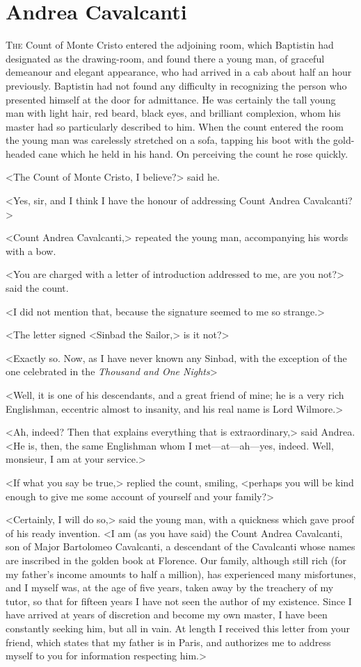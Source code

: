 \chapter{Andrea Cavalcanti} 

 \lettrine{T}{he} Count of Monte Cristo entered the adjoining room, which Baptistin had designated as the drawing-room, and found there a young man, of graceful demeanour and elegant appearance, who had arrived in a cab about half an hour previously. Baptistin had not found any difficulty in recognizing the person who presented himself at the door for admittance. He was certainly the tall young man with light hair, red beard, black eyes, and brilliant complexion, whom his master had so particularly described to him. When the count entered the room the young man was carelessly stretched on a sofa, tapping his boot with the gold-headed cane which he held in his hand. On perceiving the count he rose quickly. 

 <The Count of Monte Cristo, I believe?> said he. 

 <Yes, sir, and I think I have the honour of addressing Count Andrea Cavalcanti?> 

 <Count Andrea Cavalcanti,> repeated the young man, accompanying his words with a bow. 

 <You are charged with a letter of introduction addressed to me, are you not?> said the count. 

 <I did not mention that, because the signature seemed to me so strange.> 

 <The letter signed <Sinbad the Sailor,> is it not?> 

 <Exactly so. Now, as I have never known any Sinbad, with the exception of the one celebrated in the \textit{Thousand and One Nights}\longdash> 

 <Well, it is one of his descendants, and a great friend of mine; he is a very rich Englishman, eccentric almost to insanity, and his real name is Lord Wilmore.> 

 <Ah, indeed? Then that explains everything that is extraordinary,> said Andrea. <He is, then, the same Englishman whom I met—at—ah—yes, indeed. Well, monsieur, I am at your service.> 

 <If what you say be true,> replied the count, smiling, <perhaps you will be kind enough to give me some account of yourself and your family?> 

 <Certainly, I will do so,> said the young man, with a quickness which gave proof of his ready invention. <I am (as you have said) the Count Andrea Cavalcanti, son of Major Bartolomeo Cavalcanti, a descendant of the Cavalcanti whose names are inscribed in the golden book at Florence. Our family, although still rich (for my father's income amounts to half a million), has experienced many misfortunes, and I myself was, at the age of five years, taken away by the treachery of my tutor, so that for fifteen years I have not seen the author of my existence. Since I have arrived at years of discretion and become my own master, I have been constantly seeking him, but all in vain. At length I received this letter from your friend, which states that my father is in Paris, and authorizes me to address myself to you for information respecting him.> 

